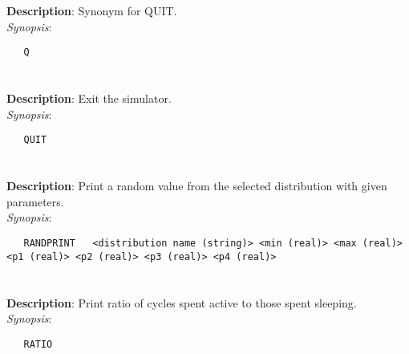 \section{\quad{}}
\label{manpages:Q}
\label{manpages:q}
\vspace{-0.1in}
{\bf Description}: 	Synonym for QUIT.\\[1.5ex]
{\em Synopsis}:
\vspace{-0.05in}
\scriptsize
\begin{lstlisting}
   Q   												
\end{lstlisting}
\normalsize
\vspace{-0.05in}


\section{\quad{}}
\label{manpages:QUIT}
\label{manpages:quit}
\vspace{-0.1in}
{\bf Description}: 	Exit the simulator.\\[1.5ex]
{\em Synopsis}:
\vspace{-0.05in}
\scriptsize
\begin{lstlisting}
   QUIT   											
\end{lstlisting}
\normalsize
\vspace{-0.05in}


\section{\quad{}}
\label{manpages:RANDPRINT}
\label{manpages:randprint}
\vspace{-0.1in}
{\bf Description}: 	Print a random value from the selected distribution with given parameters.\\[1.5ex]
{\em Synopsis}:
\vspace{-0.05in}
\scriptsize
\begin{lstlisting}
   RANDPRINT   <distribution name (string)> <min (real)> <max (real)> <p1 (real)> <p2 (real)> <p3 (real)> <p4 (real)>			
\end{lstlisting}
\normalsize
\vspace{-0.05in}


\section{\quad{}}
\label{manpages:RATIO}
\label{manpages:ratio}
\vspace{-0.1in}
{\bf Description}: 	Print ratio of cycles spent active to those spent sleeping.\\[1.5ex]
{\em Synopsis}:
\vspace{-0.05in}
\scriptsize
\begin{lstlisting}
   RATIO   						
\end{lstlisting}
\normalsize
\vspace{-0.05in}


